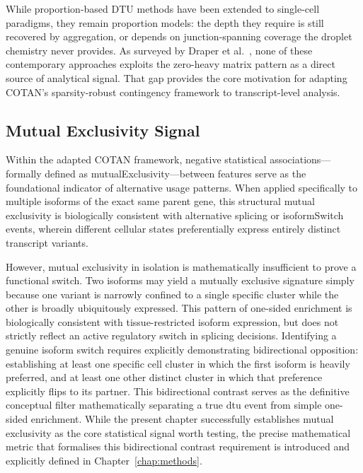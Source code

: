 While proportion-based DTU methods have been extended to single-cell paradigms, they remain proportion models: the depth they require is still recovered by aggregation, or depends on junction-spanning coverage the droplet chemistry never provides. As surveyed by Draper et al.\ \cite{draper2025selecting}, none of these contemporary approaches exploits the zero-heavy matrix pattern as a direct source of analytical signal. That gap provides the core motivation for adapting COTAN's sparsity-robust contingency framework to transcript-level analysis.

\subsection{Mutual Exclusivity Signal}\label{sec:mutual-exclusivity}

Within the adapted COTAN framework, negative statistical associations---formally defined as \gls{mutualExclusivity}---between features serve as the foundational indicator of alternative usage patterns. When applied specifically to multiple isoforms of the exact same parent gene, this structural mutual exclusivity is biologically consistent with alternative splicing or \gls{isoformSwitch} events, wherein different cellular states preferentially express entirely distinct transcript variants.

However, mutual exclusivity in isolation is mathematically insufficient to prove a functional switch. Two isoforms may yield a mutually exclusive signature simply because one variant is narrowly confined to a single specific cluster while the other is broadly ubiquitously expressed. This pattern of one-sided enrichment is biologically consistent with tissue-restricted isoform expression, but does not strictly reflect an active regulatory switch in splicing decisions. Identifying a genuine isoform switch requires explicitly demonstrating bidirectional opposition: establishing at least one specific cell cluster in which the first isoform is heavily preferred, and at least one other distinct cluster in which that preference explicitly flips to its partner. This bidirectional contrast serves as the definitive conceptual filter mathematically separating a true \gls{dtu} event from simple one-sided enrichment. While the present chapter successfully establishes mutual exclusivity as the core statistical signal worth testing, the precise mathematical metric that formalises this bidirectional contrast requirement is introduced and explicitly defined in Chapter~\ref{chap:methods}.